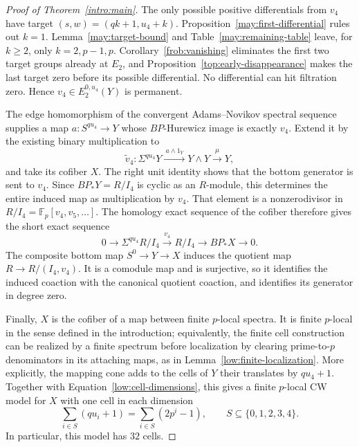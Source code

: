 \begin{proof}[Proof of Theorem~\ref{intro:main}]
The only possible positive differentials from $v_4$ have target
$(s,w)=(qk+1,u_4+k)$. Proposition~\ref{may:first-differential}
rules out $k=1$. Lemma~\ref{may:target-bound} and
Table~\ref{may:remaining-table} leave, for $k\geq2$, only
$k=2,p-1,p$. Corollary~\ref{frob:vanishing} eliminates the
first two target groups already at $E_2$, and
Proposition~\ref{top:early-disappearance} makes the last target
zero before its possible differential. No differential can hit
filtration zero. Hence $v_4\in E_2^{0,u_4}(Y)$ is permanent.

The edge homomorphism of the convergent Adams--Novikov spectral
sequence supplies a map
$a:S^{qu_4}\to Y$ whose $BP$-Hurewicz image is exactly $v_4$.
Extend it by the existing binary multiplication to
\[
 \widetilde v_4:\Sigma^{qu_4}Y
 \xrightarrow{\ a\wedge1_Y\ }Y\wedge Y
 \xrightarrow{\ \mu\ }Y,
\]
and take its cofiber $X$.
The right unit identity shows that the bottom generator is sent
to $v_4$. Since $BP_*Y=R/I_4$ is cyclic as an $R$-module, this
determines the entire induced map as multiplication by $v_4$.
That element is a nonzerodivisor in
$R/I_4=\mathbb F_p[v_4,v_5,\ldots]$. The homology exact sequence
of the cofiber therefore gives the short exact sequence
\[
 0\longrightarrow\Sigma^{qu_4}R/I_4
 \xrightarrow{\ v_4\ }R/I_4
 \longrightarrow BP_*X\longrightarrow0.
\]
The composite bottom map $S^0\to Y\to X$ induces the quotient
map $R\to R/(I_4,v_4)$. It is a comodule map and is surjective,
so it identifies the induced coaction with the canonical quotient
coaction, and identifies its generator in degree zero.

Finally, $X$ is the cofiber of a map between finite $p$-local
spectra. It is finite $p$-local in the sense defined in the introduction;
equivalently, the finite cell construction can be realized by a
finite spectrum before localization by clearing prime-to-$p$
denominators in its attaching maps, as in
Lemma~\ref{low:finite-localization}. More explicitly, the mapping cone
adds to the cells of $Y$ their translates by $qu_4+1$.
Together with Equation~\eqref{low:cell-dimensions}, this gives a finite
$p$-local CW model for $X$ with one cell in each dimension
\[
 \sum_{i\in S}(qu_i+1)=\sum_{i\in S}(2p^i-1),
 \qquad S\subseteq\{0,1,2,3,4\}.
\]
In particular, this model has $32$ cells.
\end{proof}
